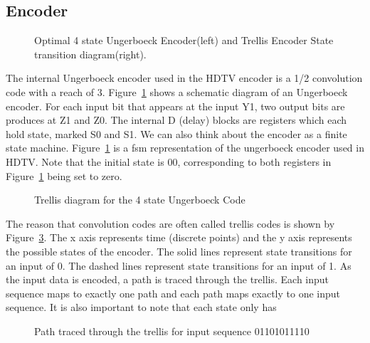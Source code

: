 \subsection{Encoder}

\begin{figure}
\center
\epsfxsize=3.0in
\epsfxsize=3.0in
\caption{Optimal 4 state Ungerboeck Encoder(left) and Trellis Encoder State transition diagram(right).}
\label{fig:ungerboeck-and-std}
\end{figure}

The internal Ungerboeck encoder used in the HDTV encoder is
a 1/2 convolution code with a reach of 3. Figure~\ref{fig:ungerboeck-and-std}
shows a schematic diagram of an Ungerboeck encoder. For each input bit
that appears at the input Y1, two output bits are produces at Z1 and Z0.
The internal D (delay) blocks are registers which each hold state, marked
S0 and S1. We can also think about the encoder as a finite state machine.
Figure~\ref{fig:ungerboeck-and-std} is a fsm representation of the ungerboeck
encoder used in HDTV. Note that the initial state is 00, corresponding to 
both registers in Figure~\ref{fig:ungerboeck-and-std} being set to zero.

\begin{figure}
\center
\epsfxsize=5.5in
\caption{Trellis diagram for the 4 state Ungerboeck Code}
\label{fig:trellis-blank}
\end{figure}

The reason that convolution codes are often called trellis codes is shown by 
Figure~\ref{fig:trellis-example}. The x axis represents time (discrete points)
and the y axis represents the possible states of the encoder. The solid lines
represent state transitions for an input of 0. The dashed lines represent
state transitions for an input of 1. As the input
data is encoded, a path is traced through the trellis. Each input sequence maps 
to exactly one path and each path maps exactly to one input sequence. It
is also important to note that each state only has 

\begin{figure}
\center
\epsfxsize=5.5in
\caption{Path traced through the trellis for input sequence 01101011110}
\label{fig:trellis-example}
\end{figure}

